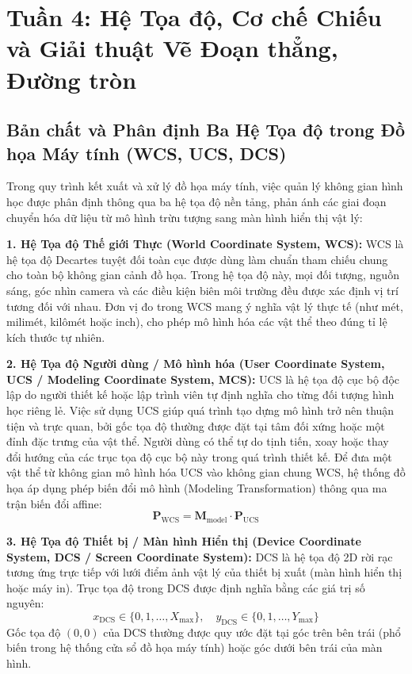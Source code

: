 \section{Tuần 4: Hệ Tọa độ, Cơ chế Chiếu và Giải thuật Vẽ Đoạn thẳng, Đường tròn}
\label{sec:week4}

\subsection{Bản chất và Phân định Ba Hệ Tọa độ trong Đồ họa Máy tính (WCS, UCS, DCS)}
\label{subsec:w4_coord}

Trong quy trình kết xuất và xử lý đồ họa máy tính, việc quản lý không gian hình học được phân định thông qua ba hệ tọa độ nền tảng, phản ánh các giai đoạn chuyển hóa dữ liệu từ mô hình trừu tượng sang màn hình hiển thị vật lý:

\textbf{1. Hệ Tọa độ Thế giới Thực (World Coordinate System, WCS):}
WCS là hệ tọa độ Decartes tuyệt đối toàn cục được dùng làm chuẩn tham chiếu chung cho toàn bộ không gian cảnh đồ họa. Trong hệ tọa độ này, mọi đối tượng, nguồn sáng, góc nhìn camera và các điều kiện biên môi trường đều được xác định vị trí tương đối với nhau. Đơn vị đo trong WCS mang ý nghĩa vật lý thực tế (như mét, milimét, kilômét hoặc inch), cho phép mô hình hóa các vật thể theo đúng tỉ lệ kích thước tự nhiên.

\textbf{2. Hệ Tọa độ Người dùng / Mô hình hóa (User Coordinate System, UCS / Modeling Coordinate System, MCS):}
UCS là hệ tọa độ cục bộ độc lập do người thiết kế hoặc lập trình viên tự định nghĩa cho từng đối tượng hình học riêng lẻ. Việc sử dụng UCS giúp quá trình tạo dựng mô hình trở nên thuận tiện và trực quan, bởi gốc tọa độ thường được đặt tại tâm đối xứng hoặc một đỉnh đặc trưng của vật thể. Người dùng có thể tự do tịnh tiến, xoay hoặc thay đổi hướng của các trục tọa độ cục bộ này trong quá trình thiết kế. Để đưa một vật thể từ không gian mô hình hóa UCS vào không gian chung WCS, hệ thống đồ họa áp dụng phép biến đổi mô hình (Modeling Transformation) thông qua ma trận biến đổi affine:
\begin{equation}
\mathbf{P}_{\text{WCS}} = \mathbf{M}_{\text{model}} \cdot \mathbf{P}_{\text{UCS}}
\end{equation}

\textbf{3. Hệ Tọa độ Thiết bị / Màn hình Hiển thị (Device Coordinate System, DCS / Screen Coordinate System):}
DCS là hệ tọa độ 2D rời rạc tương ứng trực tiếp với lưới điểm ảnh vật lý của thiết bị xuất (màn hình hiển thị hoặc máy in). Trục tọa độ trong DCS được định nghĩa bằng các giá trị số nguyên:
\begin{equation}
x_{\text{DCS}} \in \{0, 1, \dots, X_{\max}\}, \quad y_{\text{DCS}} \in \{0, 1, \dots, Y_{\max}\}
\end{equation}
Gốc tọa độ $(0, 0)$ của DCS thường được quy ước đặt tại góc trên bên trái (phổ biến trong hệ thống cửa sổ đồ họa máy tính) hoặc góc dưới bên trái của màn hình. 

